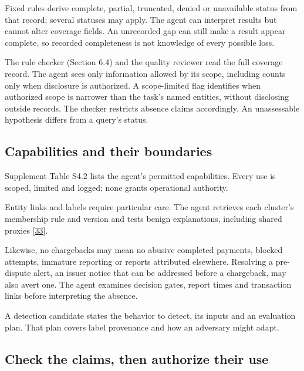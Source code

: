 \documentclass[acmlarge,nonacm]{acmart}
\begin{document}
Fixed rules derive complete, partial, truncated, denied or unavailable
status from that record; several statuses may apply. The agent can
interpret results but cannot alter coverage fields. An unrecorded gap
can still make a result appear complete, so recorded completeness is not
knowledge of every possible loss.

The rule checker (Section 6.4) and the quality reviewer read the full
coverage record. The agent sees only information allowed by its scope,
including counts only when disclosure is authorized. A scope-limited
flag identifies when authorized scope is narrower than the task's named
entities, without disclosing outside records. The checker restricts
absence claims accordingly. An unassessable hypothesis differs from a
query's status.

\hypertarget{capabilities-and-their-boundaries}{%
\subsection{Capabilities and their
boundaries}\label{capabilities-and-their-boundaries}}

Supplement Table S4.2 lists the agent's permitted capabilities. Every
use is scoped, limited and logged; none grants operational authority.

Entity links and labels require particular care. The agent retrieves
each cluster's membership rule and version and tests benign
explanations, including shared proxies
{[}\protect\hyperlink{ref-Liu2018GEM}{33}{]}.

Likewise, no chargebacks may mean no abusive completed payments, blocked
attempts, immature reporting or reports attributed elsewhere. Resolving
a pre-dispute alert, an issuer notice that can be addressed before a
chargeback, may also avert one. The agent examines decision gates,
report times and transaction links before interpreting the absence.

A detection candidate states the behavior to detect, its inputs and an
evaluation plan. That plan covers label provenance and how an adversary
might adapt.

\hypertarget{check-the-claims-then-authorize-their-use}{%
\subsection{Check the claims, then authorize their
use}\label{check-the-claims-then-authorize-their-use}}
\end{document}
